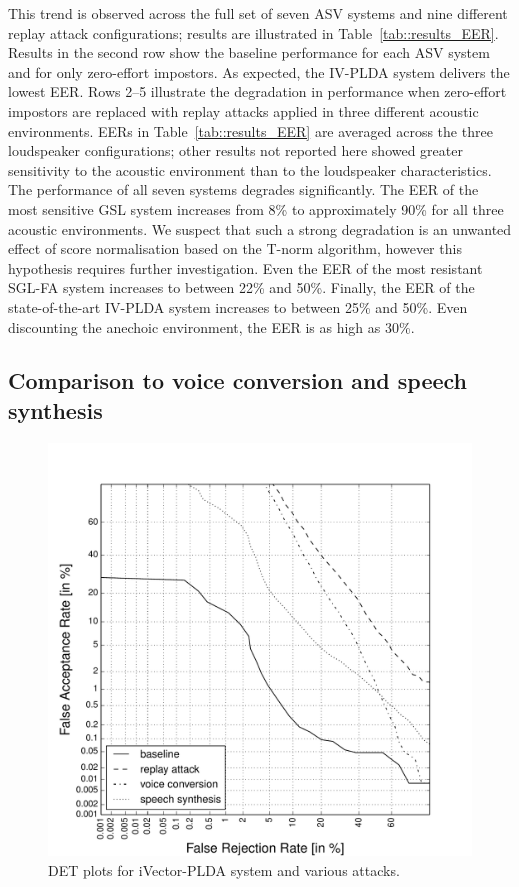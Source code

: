 This trend is observed across the full set of seven ASV systems and nine different replay attack configurations;  
results are illustrated in Table~\ref{tab::results_EER}.
Results in the second row show the baseline performance for each ASV system and for only zero-effort impostors.
As expected, the IV-PLDA system delivers the lowest EER.
Rows 2--5 illustrate the degradation in performance when zero-effort impostors are replaced with replay attacks applied in three different acoustic environments.
EERs in Table~\ref{tab::results_EER} are averaged across the three loudspeaker configurations; other results not reported here showed greater sensitivity to the acoustic environment than to the loudspeaker characteristics.  
The performance of all seven systems degrades significantly.
The EER of the most sensitive GSL system increases from 8\% to approximately 90\% for all three acoustic environments. We suspect that such a strong degradation is an unwanted effect of score normalisation based on the T-norm algorithm, however this hypothesis requires further investigation.
Even the EER of the most resistant SGL-FA system increases to between 22\% and 50\%.  
Finally, the EER of the state-of-the-art IV-PLDA system increases to between 25\% and 50\%.  Even discounting the anechoic environment, the EER is as high as 30\%.


\subsection{Comparison to voice conversion and speech synthesis}

\begin{figure}[!t]
	\centering
	\includegraphics[width=1\linewidth]{Figs/DETs_IV_ss_vc_rp.pdf}
	\caption{DET plots for iVector-PLDA system and various attacks.}
	\label{fig::DETs_4attacks}
\end{figure}

